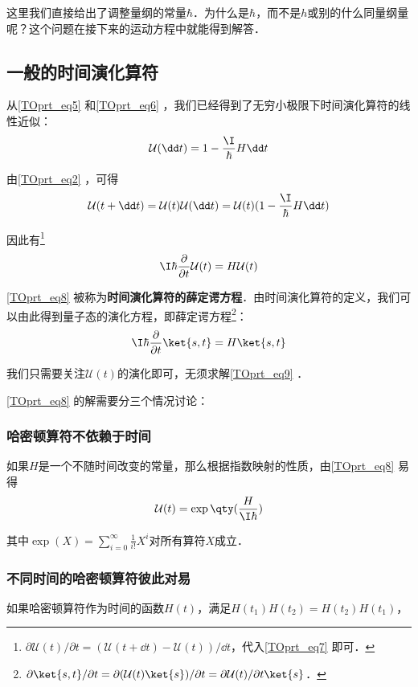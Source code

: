 这里我们直接给出了调整量纲的常量$\hbar$．为什么是$\hbar$，而不是$h$或别的什么同量纲量呢？这个问题在接下来的运动方程中就能得到解答．



\subsection{一般的时间演化算符}

从\autoref{TOprt_eq5} 和\autoref{TOprt_eq6} ，我们已经得到了无穷小极限下时间演化算符的线性近似：
\begin{equation}
\mathcal{U}(\dd t)=1-\frac{\I}{\hbar}H \dd t
\end{equation}

由\autoref{TOprt_eq2} ，可得
\begin{equation}\label{TOprt_eq7}
\mathcal{U}(t+\dd t) = \mathcal{U}(t)\mathcal{U}(\dd t) = \mathcal{U}(t)(1-\frac{\I}{\hbar}H \dd t)
\end{equation}

因此有\footnote{$\partial\mathcal{U}(t)/\partial t=(\mathcal{U}(t+\dd t)-\mathcal{U}(t))/\dd t$，代入\autoref{TOprt_eq7} 即可．}
\begin{equation}\label{TOprt_eq8}
\I\hbar\frac{\partial}{\partial t}\mathcal{U}(t) = H\mathcal{U}(t)
\end{equation}


\autoref{TOprt_eq8} 被称为\textbf{时间演化算符的薛定谔方程}．由时间演化算符的定义，我们可以由此得到量子态的演化方程，即薛定谔方程\footnote{$\partial\ket{s, t}/\partial t=\partial(\mathcal{U}(t)\ket{s})/\partial t=\partial \mathcal{U}(t)/\partial t \ket{s}$．}：
\begin{equation}\label{TOprt_eq9}
\I\hbar\frac{\partial}{\partial t}\ket{s, t} = H\ket{s, t}
\end{equation}


我们只需要关注$\mathcal{U}(t)$的演化即可，无须求解\autoref{TOprt_eq9} ．

\autoref{TOprt_eq8} 的解需要分三个情况讨论：


\subsubsection{哈密顿算符不依赖于时间}

如果$H$是一个不随时间改变的常量，那么根据指数映射的性质，由\autoref{TOprt_eq8} 易得
\begin{equation}
\mathcal{U}(t) = \exp\qty(\frac{H}{\I \hbar})
\end{equation}

其中$\exp(X)=\sum_{i=0}^\infty \frac{1}{i!}X^i$对所有算符$X$成立．



\subsubsection{不同时间的哈密顿算符彼此对易}

如果哈密顿算符作为时间的函数$H(t)$，满足$H(t_1)H(t_2)=H(t_2)H(t_1)$，

















